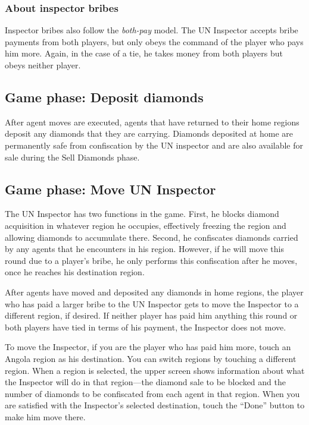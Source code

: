 \documentclass[8pt]{extbook}
\begin{document}
\subsubsection{About inspector bribes}
Inspector bribes also follow the {\it both-pay} model.  The UN Inspector accepts bribe payments from both players, but only obeys the command of the player who pays him more.  Again, in the case of a tie, he takes money from both players but obeys neither player.

\subsection{Game phase:  Deposit diamonds}
\label{sec:depositPhase}

After agent moves are executed, agents that have returned to their home regions deposit any diamonds that they are carrying.  Diamonds deposited at home are permanently safe from confiscation by the UN inspector and are also available for sale during the Sell Diamonds phase.

\subsection{Game phase:  Move UN Inspector}
\label{sec:inspectorPhase}

The UN Inspector has two functions in the game.  First, he blocks diamond acquisition in whatever region he occupies, effectively freezing the region and allowing diamonds to accumulate there.  Second, he confiscates diamonds carried by any agents that he encounters in his region.  However, if he will move this round due to a player's bribe, he only performs this confiscation after he moves, once he reaches his destination region.

After agents have moved and deposited any diamonds in home regions, the player who has paid a larger bribe to the UN Inspector gets to move the Inspector to a different region, if desired.  If neither player has paid him anything this round or both players have tied in terms of his payment, the Inspector does not move.

To move the Inspector, if you are the player who has paid him more, touch an Angola region as his destination.  You can switch regions by touching a different region.  When a region is selected, the upper screen shows information about what the Inspector will do in that region---the diamond sale to be blocked and the number of diamonds to be confiscated from each agent in that region.  When you are satisfied with the Inspector's selected destination, touch the ``Done'' button to make him move there.
\end{document}
